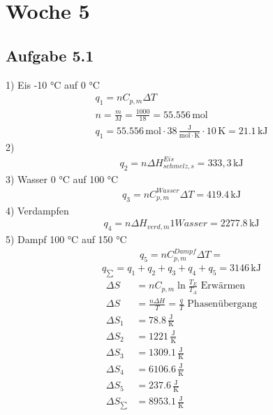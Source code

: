 \documentclass{article}
\begin{document}
\section*{Woche 5}
\subsection*{Aufgabe 5.1}
1) Eis -10 °C auf 0 °C
\begin{eqnarray*}
    q_1 = nC_{p,m}\Delta T\\
    n = \frac{m}{M} = \frac{1000}{18} = 55.556\,\mathrm{mol}\\
    q_1 = 55.556\,\mathrm{mol}\cdot 38\,\mathrm{\frac{J}{mol\cdot K}}\cdot 10\,\mathrm{K}=21.1\,\mathrm{kJ}
\end{eqnarray*}
2)
\begin{eqnarray*}
    q_2 = n\Delta H_{schmelz,s}^{Eis} = 333,3\,\mathrm{kJ}
\end{eqnarray*}
3) Wasser 0 °C auf 100 °C
\begin{eqnarray*}
    q_3 = nC_{p,m}^{Wasser}\Delta T =419.4\,\mathrm{kJ}
\end{eqnarray*}
4) Verdampfen
\begin{eqnarray*}
    q_4 = n \Delta H_{verd,m}1{Wasser} = 2277.8\,\mathrm{kJ}
\end{eqnarray*}
5) Dampf 100 °C auf 150 °C
\begin{eqnarray*}
    q_5 = nC_{p,m}^{Dampf} \Delta T = 
\end{eqnarray*}
\begin{equation*}
    q_{\sum} = q_1 + q_2 + q_3 + q_4 + q_5 = 3146\,\mathrm{kJ}
\end{equation*}
\begin{align*}
    \Delta S &= n C_{p,m} \ln\frac{T_E}{T_A}\text{ Erwärmen}\\
    \Delta S &= \frac{n\Delta H}{T}=\frac{q}{T}\text{ Phasenübergang}\\
    \Delta S_1 &= 78.8\,\mathrm{\frac{J}{K}}\\
    \Delta S_2 &= 1221\,\mathrm{\frac{J}{K}}\\
    \Delta S_3 &= 1309.1\,\mathrm{\frac{J}{K}}\\
    \Delta S_4 &= 6106.6\,\mathrm{\frac{J}{K}}\\
    \Delta S_5 &= 237.6\,\mathrm{\frac{J}{K}}\\
    \Delta S_{\sum} &= 8953.1\,\mathrm{\frac{J}{K}}
\end{align*}
\end{document}
